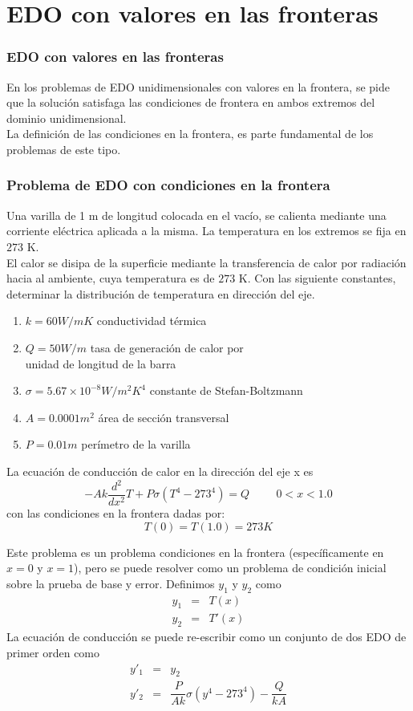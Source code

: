\section{EDO con valores en las fronteras}
\begin{frame}
\frametitle{EDO con valores en las fronteras}
En los problemas de EDO unidimensionales con valores en la frontera, se pide que la soluci\'{o}n satisfaga las condiciones de frontera en ambos extremos del dominio unidimensional.
\\
\bigskip
La definici\'{o}n de las condiciones en la frontera, es parte fundamental de los problemas de este tipo.
\end{frame}
\begin{frame}
\frametitle{Problema de EDO con condiciones en la frontera}
Una varilla de 1 m de longitud colocada en el vac\'{i}o, se calienta mediante una corriente el\'{e}ctrica aplicada a la misma. La temperatura en los extremos se fija en $273$ K. 
\\
\bigskip
El calor se disipa de la superficie mediante la transferencia de calor por radiaci\'{o}n hacia al ambiente, cuya temperatura es de $273$ K. Con las siguiente constantes, determinar la distribuci\'{o}n de temperatura en dirección del eje.
\end{frame}
\begin{frame}
\begin{enumerate}
\item $ k= 60 W/mK$ conductividad t\'{e}rmica
\item $Q=50 W/m$ tasa de generaci\'{o}n de calor por \\ unidad de longitud de la barra
\item $\sigma = 5.67 \times 10^{-8} W/m^{2}K^{4}$ constante de Stefan-Boltzmann
\item $A=0.0001 m^{2}$ \'{a}rea de secci\'{o}n transversal
\item $P=0.01 m$ per\'{i}metro de la varilla
\end{enumerate}
La ecuaci\'{o}n de conducci\'{o}n de calor en la direcci\'{o}n del eje x es
\[ -Ak \dfrac{d^{2}}{dx^{2}} T + P \sigma (T^{4}-273^{4})=Q \hspace{1cm} 0<x<1.0 \]
con las condiciones en la frontera dadas por:
\[ T(0) = T(1.0) = 273 K \]
\end{frame}
\begin{frame}
Este problema es un problema condiciones en la frontera (espec\'{i}ficamente en $x=0$ y $x=1$), pero se puede resolver como un problema de condici\'{o}n inicial sobre la prueba de base y error. Definimos $y_{1}$ y $y_{2}$ como
\begin{eqnarray*}
y_{1} & = & T(x) \\
y_{2} & = & T'(x) 
\end{eqnarray*}
La ecuaci\'{o}n de conducci\'{o}n se puede re-escribir como un conjunto de dos EDO de primer orden como
\begin{eqnarray*}
y'_{1} & = & y_{2} \\
y'_{2} & = & \dfrac{P}{Ak} \sigma  \left( y^{4} - 273^{4} \right) - \dfrac{Q}{kA}
\end{eqnarray*}
\end{frame}
